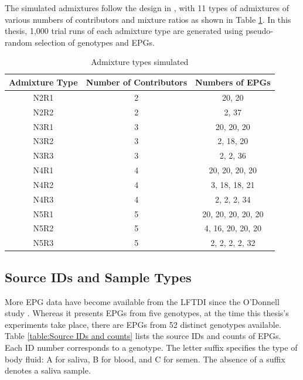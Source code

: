 The simulated admixtures follow the design in \cite{odonnell_clustering_2021}, with 11 types of admixtures of various numbers of contributors and mixture ratios as shown in Table \ref{table:Admixture types simulated}. In this thesis, 1,000 trial runs of each admixture type are generated using pseudo-random selection of genotypes and EPGs.

\begin{table}[htbp]
\centering
\begin{tabular}{ccc}
\toprule
Admixture Type &  Number of Contributors &    Numbers of EPGs \\
\midrule
          N2R1 &                       2 &             20, 20 \\
          N2R2 &                       2 &              2, 37 \\
          N3R1 &                       3 &         20, 20, 20 \\
          N3R2 &                       3 &          2, 18, 20 \\
          N3R3 &                       3 &           2, 2, 36 \\
          N4R1 &                       4 &     20, 20, 20, 20 \\
          N4R2 &                       4 &      3, 18, 18, 21 \\
          N4R3 &                       4 &        2, 2, 2, 34 \\
          N5R1 &                       5 & 20, 20, 20, 20, 20 \\
          N5R2 &                       5 &  4, 16, 20, 20, 20 \\
          N5R3 &                       5 &     2, 2, 2, 2, 32 \\
\bottomrule
\end{tabular}
\caption{Admixture types simulated}
\label{table:Admixture types simulated}
\end{table}

\subsection{Source IDs and Sample Types}
\label{subsection:Source IDs and Sample Types}

More EPG data have become available from the LFTDI since the O'Donnell study \cite{odonnell_clustering_2021}. Whereas it presents EPGs from five genotypes, at the time this thesis's experiments take place, there are EPGs from 52 distinct genotypes available. Table \ref{table:Source IDs and counts} lists the source IDs and counts of EPGs. Each ID number corresponds to a genotype. The letter suffix specifies the type of body fluid: A for saliva, B for blood, and C for semen. The absence of a suffix denotes a saliva sample.

